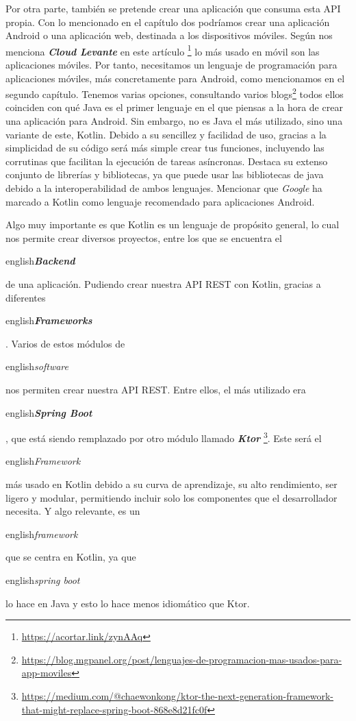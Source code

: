 Por otra parte, también se pretende crear una aplicación que consuma esta API propia. Con lo mencionado en el capítulo dos podríamos crear una aplicación Android o una aplicación web, destinada a los dispositivos móviles. Según nos menciona \textbf{\textit{Cloud Levante}} en este artículo \footnote{\url{https://acortar.link/zynAAq}} lo más usado en móvil son las aplicaciones móviles. Por tanto, necesitamos un lenguaje de programación para aplicaciones móviles, más concretamente para Android, como mencionamos en el segundo capítulo. Tenemos varias opciones, consultando varios blogs\footnote{\url{https://blog.mgpanel.org/post/lenguajes-de-programacion-mas-usados-para-app-moviles}} todos ellos coinciden con qué Java es el primer lenguaje en el que piensas a la hora de crear una aplicación para Android. Sin embargo, no es Java el más utilizado, sino una variante de este, Kotlin. Debido a su sencillez y facilidad de uso, gracias a la simplicidad de su código será más simple crear tus funciones, incluyendo las corrutinas que facilitan la ejecución de tareas asíncronas. Destaca su extenso conjunto de librerías y bibliotecas, ya que puede usar las bibliotecas de java debido a la interoperabilidad de ambos lenguajes. Mencionar que \textit{Google} ha marcado a Kotlin como lenguaje recomendado para aplicaciones Android.

Algo muy importante es que Kotlin es un lenguaje de propósito general, lo cual nos permite crear diversos proyectos, entre los que se encuentra el \begin{otherlanguage}
{english}\textit{\textbf{Backend}}\end{otherlanguage} de una aplicación. Pudiendo crear nuestra API REST con Kotlin, gracias a diferentes \begin{otherlanguage}
{english}\textit{\textbf{Frameworks}}\end{otherlanguage} \cite{FrameWrk}. Varios de estos módulos de \begin{otherlanguage}
{english}\textit{software}\end{otherlanguage} nos permiten crear nuestra API REST. Entre ellos, el más utilizado era \begin{otherlanguage}
{english}\textbf{\textit{Spring Boot}}\end{otherlanguage}, que está siendo remplazado por otro módulo llamado \textbf{\textit{Ktor}} \footnote{\url{https://medium.com/@chaewonkong/ktor-the-next-generation-framework-that-might-replace-spring-boot-868e8d21fc0f}}. Este será el \begin{otherlanguage}
{english}\textit{Framework}\end{otherlanguage} más usado en Kotlin debido a su curva de aprendizaje, su alto rendimiento, ser ligero y modular, permitiendo incluir solo los componentes que el desarrollador necesita. Y algo relevante, es un \begin{otherlanguage}
{english}\textit{framework}\end{otherlanguage} que se centra en Kotlin, ya que \begin{otherlanguage}
{english}\textit{spring boot}\end{otherlanguage} lo hace en Java y esto lo hace menos idiomático que Ktor.

